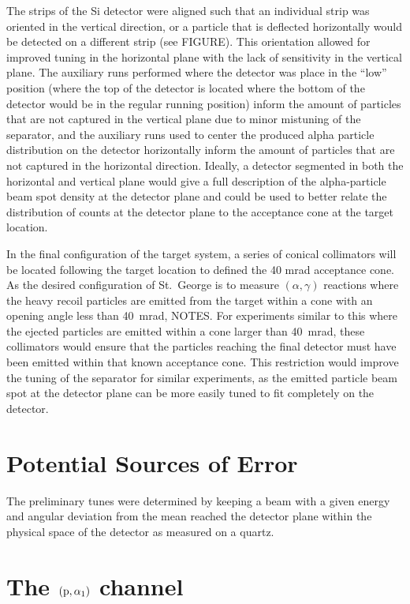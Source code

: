 The strips of the Si detector were aligned such that an individual strip
was oriented in the vertical direction, or a particle that is deflected
horizontally would be detected on a different strip (see FIGURE).
This orientation allowed for improved tuning in the horizontal plane
with the lack of sensitivity in the vertical plane. The auxiliary runs
performed where the detector was place in the ``low'' position (where
the top of the detector is located where the bottom of the detector
would be in the regular running position) inform the amount of particles
that are not captured in the vertical plane due to minor mistuning of
the separator, and the auxiliary runs used to center the produced alpha
particle distribution on the detector horizontally inform the amount of
particles that are not captured in the horizontal direction. Ideally, a
detector segmented in both the horizontal and vertical plane would give
a full description of the alpha-particle beam spot density at the
detector plane and could be used to better relate the distribution of
counts at the detector plane to the acceptance cone at the target
location.

In the final configuration of the target system, a series of conical
collimators will be located following the target location to defined the
40 mrad acceptance cone. As the desired configuration of St.\ George is
to measure $(\alpha,\gamma)$ reactions where the heavy recoil particles are
emitted from the target within a cone with an opening angle less than 40~mrad,
NOTES. For experiments similar to this where the ejected
particles are emitted within a cone larger than 40~mrad, these
collimators would ensure that the particles reaching the final detector
must have been emitted within that known acceptance cone. This
restriction would improve the tuning of the separator for similar
experiments, as the emitted particle beam spot at the detector plane can
be more easily tuned to fit completely on the detector.


\section{Potential Sources of Error}
\label{sec:potential-sources-of-error}

The preliminary tunes were determined by keeping a beam with a given
energy and angular deviation from the mean reached the detector plane
within the physical space of the detector as measured on a quartz.


\section{The $(\rm{p},\alpha_1)$ channel}
\label{sec:the-palpha_1-channel}

